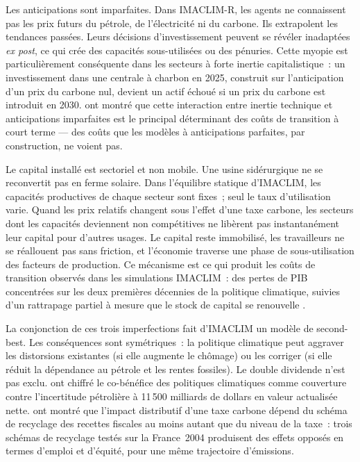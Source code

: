 Les anticipations sont imparfaites. Dans IMACLIM-R, les agents ne connaissent pas les prix futurs du pétrole, de l'électricité ni du carbone. Ils extrapolent les tendances passées. Leurs décisions d'investissement peuvent se révéler inadaptées \emph{ex post}, ce qui crée des capacités sous-utilisées ou des pénuries. Cette myopie est particulièrement conséquente dans les secteurs à forte inertie capitalistique~: un investissement dans une centrale à charbon en 2025, construit sur l'anticipation d'un prix du carbone nul, devient un actif échoué si un prix du carbone est introduit en 2030. \textcite{waisman_imaclim-r_2012} ont montré que cette interaction entre inertie technique et anticipations imparfaites est le principal déterminant des coûts de transition à court terme --- des coûts que les modèles à anticipations parfaites, par construction, ne voient pas.

Le capital installé est sectoriel et non mobile. Une usine sidérurgique ne se reconvertit pas en ferme solaire. Dans l'équilibre statique d'IMACLIM, les capacités productives de chaque secteur sont fixes~; seul le taux d'utilisation varie. Quand les prix relatifs changent sous l'effet d'une taxe carbone, les secteurs dont les capacités deviennent non compétitives ne libèrent pas instantanément leur capital pour d'autres usages. Le capital reste immobilisé, les travailleurs ne se réallouent pas sans friction, et l'économie traverse une phase de sous-utilisation des facteurs de production. Ce mécanisme est ce qui produit les \og coûts de transition\fg{} observés dans les simulations IMACLIM~: des pertes de PIB concentrées sur les deux premières décennies de la politique climatique, suivies d'un rattrapage partiel à mesure que le stock de capital se renouvelle \parencite{crassous_endogenous_2006}.

La conjonction de ces trois imperfections fait d'IMACLIM un modèle de second-best. Les conséquences sont symétriques~: la politique climatique peut aggraver les distorsions existantes (si elle augmente le chômage) ou les corriger (si elle réduit la dépendance au pétrole et les rentes fossiles). Le double dividende n'est pas exclu. \textcite{rozenberg_climate_2010} ont chiffré le co-bénéfice des politiques climatiques comme couverture contre l'incertitude pétrolière à 11\,500 milliards de dollars en valeur actualisée nette. \textcite{combet_carbon_2010} ont montré que l'impact distributif d'une taxe carbone dépend du schéma de recyclage des recettes fiscales au moins autant que du niveau de la taxe~: trois schémas de recyclage testés sur la France~2004 produisent des effets opposés en termes d'emploi et d'équité, pour une même trajectoire d'émissions.


